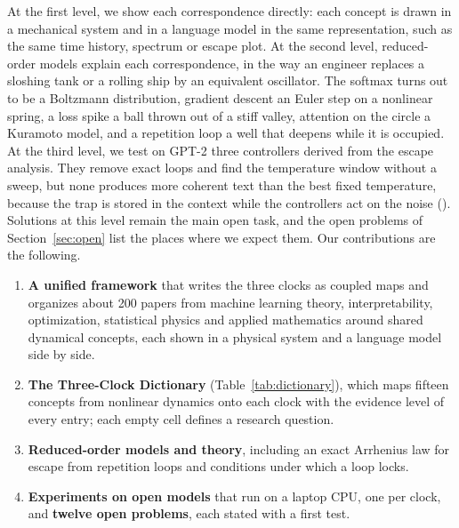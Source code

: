 At the first level, we show each correspondence directly: each concept is drawn in a mechanical system and in a language model in the same representation, such as the same time history, spectrum or escape plot. At the second level, reduced-order models explain each correspondence, in the way an engineer replaces a sloshing tank or a rolling ship by an equivalent oscillator. The softmax turns out to be a Boltzmann distribution, gradient descent an Euler step on a nonlinear spring, a loss spike a ball thrown out of a stiff valley, attention on the circle a Kuramoto model, and a repetition loop a well that deepens while it is occupied. At the third level, we test on GPT-2 three controllers derived from the escape analysis. They remove exact loops and find the temperature window without a sweep, but none produces more coherent text than the best fixed temperature, because the trap is stored in the context while the controllers act on the noise (). Solutions at this level remain the main open task, and the open problems of Section~\ref{sec:open} list the places where we expect them. Our contributions are the following.
\begin{enumerate}[leftmargin=*,itemsep=2pt]
\item \textbf{A unified framework} that writes the three clocks as coupled maps and organizes about 200 papers from machine learning theory, interpretability, optimization, statistical physics and applied mathematics around shared dynamical concepts, each shown in a physical system and a language model side by side.
\item \textbf{The Three-Clock Dictionary} (Table~\ref{tab:dictionary}), which maps fifteen concepts from nonlinear dynamics onto each clock with the evidence level of every entry; each empty cell defines a research question.
\item \textbf{Reduced-order models and theory}, including an exact Arrhenius law for escape from repetition loops and conditions under which a loop locks.
\item \textbf{Experiments on open models} that run on a laptop CPU, one per clock, and \textbf{twelve open problems}, each stated with a first test.
\end{enumerate}

